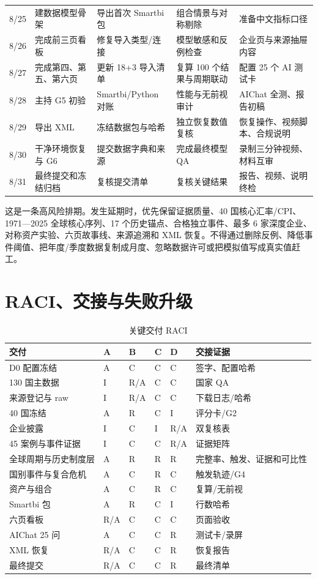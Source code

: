 \documentclass[UTF8,fontset=windows,12pt,openany]{ctexbook}
\begin{document}
\begin{landscape}
\begin{longtable}{p{2.2cm}p{4.1cm}p{3.7cm}p{3.7cm}p{3.7cm}}
8/25 & 建数据模型骨架 & 导出首次 Smartbi 包 & 组合情景与对称剔除 & 准备中文指标口径\\
8/26 & 完成前三页看板 & 修复导入类型/连接 & 模型敏感和反例检查 & 企业页与来源抽屉内容\\
8/27 & 完成第四、第五、第六页 & 更新 18+3 导入清单 & 复算 100 个结果与周期联动 & 配置 25 个 AI 测试卡\\
8/28 & 主持 G5 初验 & Smartbi/Python 对账 & 性能与无前视审计 & AIChat 全测、报告初稿\\
8/29 & 导出 XML & 冻结数据包与哈希 & 独立恢复数值复核 & 恢复操作、视频脚本、合规说明\\
8/30 & 干净环境恢复与 G6 & 提交数据字典和来源 & 完成最终模型 QA & 录制三分钟视频、材料互审\\
8/31 & 最终提交和冻结归档 & 复核提交清单 & 复核关键结果 & 报告、视频、说明终检\\
\bottomrule
\end{longtable}
\end{landscape}

这是一条高风险排期。发生延期时，优先保留证据质量、40 国核心汇率/CPI、1971—2025 全球核心序列、17 个历史锚点、合格独立事件、最多 6 家深度企业、对称资产实验、六页故事线、来源追溯和 XML 恢复。不得通过删除反例、降低事件阈值、把年度/季度数据复制成月度、忽略数据许可或把模拟值写成真实值赶工。

\chapter{RACI、交接与失败升级}

\begin{longtable}{p{4.0cm}p{1.5cm}p{1.5cm}p{1.5cm}p{1.5cm}p{3.1cm}}
\caption{关键交付 RACI}\label{tab:raci}\\
\toprule
\textbf{交付} & \textbf{A} & \textbf{B} & \textbf{C} & \textbf{D} & \textbf{交接证据}\\
\midrule
D0 配置冻结 & A & C & C & C & 签字、配置哈希\\
130 国主数据 & I & R/A & C & C & 国家 QA\\
来源登记与 raw & I & R/A & C & C & 下载日志/哈希\\
40 国冻结 & A & R & C & I & 评分卡/G2\\
企业披露 & I & C & I & R/A & 双复核表\\
45 案例与事件证据 & I & C & C & R/A & 证据矩阵\\
全球周期与历史制度层 & A & R & R & R & 完整率、触发、证据和可比性\\
国别事件与复合危机 & A & C & R & C & 触发轨迹/G4\\
资产与组合 & A & C & R & C & 复算/无前视\\
Smartbi 包 & A & R & C & I & 行数哈希\\
六页看板 & R/A & C & C & C & 页面验收\\
AIChat 25 问 & A & C & C & R & 测试卡/录屏\\
XML 恢复 & R/A & C & C & R & 恢复报告\\
最终提交 & R/A & C & C & R & 最终清单\\
\bottomrule
\end{longtable}
\end{document}

